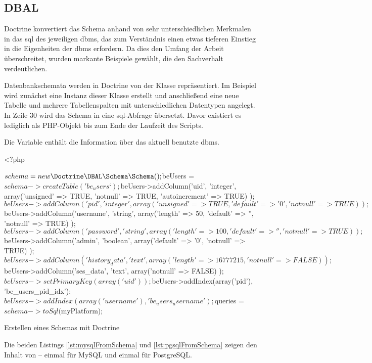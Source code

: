 \subsection{DBAL}
\label{basics:doctrine:subsec:dbal}
Doctrine konvertiert das Schema anhand von sehr unterschiedlichen Merkmalen in das \gls{sql} des jeweiligen \gls{dbms}, das zum Verständnis einen etwas tieferen Einstieg in die Eigenheiten der \gls{dbms} erfordern. Da dies den Umfang der Arbeit überschreitet, wurden markante Beispiele gewählt, die den Sachverhalt verdeutlichen.

Datenbankschemata werden in Doctrine von der Klasse  repräsentiert. Im Beispiel wird zunächst eine Instanz dieser Klasse erstellt und anschließend eine neue Tabelle und mehrere Tabellenspalten mit unterschiedlichen Datentypen angelegt. In Zeile 30 wird das Schema in eine \gls{sql}-Abfrage übersetzt. Davor existiert es lediglich als PHP-Objekt bis zum Ende der Laufzeit des Scripts.

Die Variable  enthält die Information über das aktuell benutzte \gls{dbms}.

\begin{listing}[H]
\begin{phpcode}
<?php

$schema = new \Doctrine\DBAL\Schema\Schema();
$beUsers = $schema->createTable('be_users‘);
$beUsers->addColumn('uid', 'integer',
  array('unsigned' => TRUE, 'notnull' => TRUE, 'autoincrement' => TRUE)
);
$beUsers->addColumn('pid', 'integer',
  array('unsigned' => TRUE, 'default' => '0', 'notnull' => TRUE)
);
$beUsers->addColumn('username', 'string',
  array('length' => 50, 'default' => '', 'notnull' => TRUE)
);
$beUsers->addColumn('password', 'string',
  array('length' => 100, 'default' => '', 'notnull' => TRUE)
);
$beUsers->addColumn('admin', 'boolean',
  array('default' => '0', 'notnull' => TRUE)
);
$beUsers->addColumn('history_data', 'text',
  array('length' => 16777215, 'notnull' => FALSE)
);
$beUsers->addColumn('ses_data', 'text',
  array('notnull' => FALSE)
);
$beUsers->setPrimaryKey(array('uid'));
$beUsers->addIndex(array('pid'), 'be_users_pid_idx');
$beUsers->addIndex(array('username'), 'be_users_username');

$queries = $schema->toSql($myPlatform);
\end{phpcode}
\caption{Erstellen eines Schemas mit Doctrine}
\label{lst:createSchema}
\end{listing}

Die beiden Listings \ref{lst:mysqlFromSchema} und \ref{lst:pgsqlFromSchema} zeigen den Inhalt von  – einmal für MySQL und einmal für PostgreSQL.

